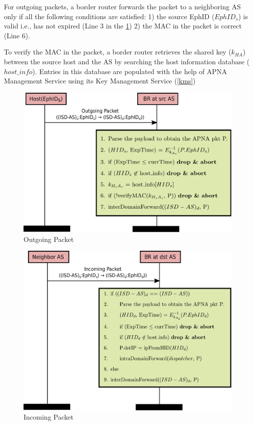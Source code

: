 For outgoing packets, a border router forwards the packet to a neighboring AS only if all the following conditions are satisfied: 1) the source EphID ($EphID_{s}$) is valid i.e., has not expired (Line 3 in the \ref{fig:overlay_src}) 2) the MAC in the packet is correct (Line 6).

To verify the MAC in the packet, a border router retrieves the shared key ($k_{HA}$) between the source host and the AS by searching the host information database ($host\_info$). Entries in this database are populated with the help of APNA Management Service using its Key Management Service (\ref{kms})

\begin{figure}[th!!]
\centering
\hspace*{2cm}\includegraphics[scale=0.5]{Figures/overlay_src.pdf}
\decoRule
\caption[Apna Overlay Outgoing Packet]{Outgoing Packet}
\label{fig:overlay_src}
\end{figure}

\begin{figure}[th!!]
\centering
\hspace*{2cm}\includegraphics[scale=0.5]{Figures/overlay_dst.pdf}
\decoRule
\caption[Apna Overlay Incoming Packet]{Incoming Packet}
\label{fig:overlay_dst}
\end{figure}
